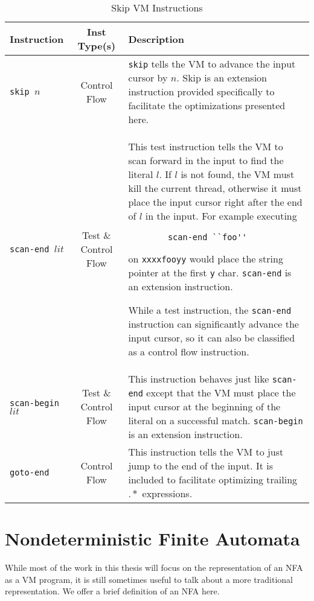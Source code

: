\begin{table}[ht]
\caption{Skip VM Instructions}
\label{table:skipinsts}
\centering

\begin{tabular}{ | l | c | p{8cm} | } \hline
Instruction & Inst Type(s) & Description \\ \hline
{\tt skip $n$} & Control Flow &
    \verb'skip' tells the VM to advance the input cursor by $n$.
    Skip is an extension
    instruction provided specifically to facilitate the optimizations
    presented here. \\ \hline
{\tt scan-end $lit$} & Test \& Control Flow &
    This test instruction tells the VM to scan forward in the input to find
    the literal $l$. If $l$ is not found, the VM must kill the current thread,
    otherwise it must place the input cursor
    right after the end of $l$ in the input. For example executing
        \begin{verbatim}
        scan-end ``foo''
        \end{verbatim}
    on \verb'xxxxfooyy' would place the string pointer at the first \verb'y'
    char. \verb'scan-end' is an extension instruction.

    While a test instruction, the \verb'scan-end' instruction can
    significantly advance the input cursor, so it can also be classified
    as a control flow instruction. \\ \hline
{\tt scan-begin $lit$} & Test \& Control Flow &
    This instruction behaves just like \verb'scan-end' except that the
    VM must place the input cursor at the beginning of the literal on
    a successful match. \verb'scan-begin' is an extension instruction.
    \\ \hline
{\tt goto-end} & Control Flow &
    This instruction tells the VM to just jump to the end of the input.
    It is included to facilitate optimizing trailing $.*$ expressions.
    \\ \hline
\end{tabular}

\end{table}

\section{Nondeterministic Finite Automata}
\label{section:nfadef}

While most of the work in this thesis will focus on the representation
of an NFA as a VM program, it is still sometimes useful to talk about
a more traditional representation. We offer
a brief definition of an NFA here.

